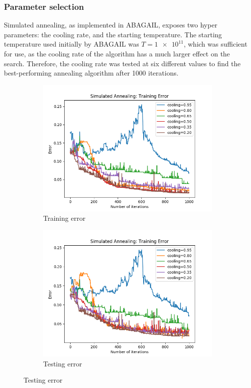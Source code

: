 \documentclass{article}
\begin{document}
      \subsubsection{Parameter selection}
        Simulated annealing, as implemented in ABAGAIL, exposes two hyper parameters: the cooling rate, and the starting temperature. The starting temperature used initially by ABAGAIL was $T = \num{1e11}$, which was sufficient for use, as the cooling rate of the algorithm has a much larger effect on the search. Therefore, the cooling rate was tested at six different values to find the best-performing annealing algorithm after 1000 iterations.

        \begin{figure}[htb]
        \centering

        \begin{subfigure}{0.5\textwidth}
          \includegraphics[width=\linewidth]{out/sa/cooling-error-training.png}
          \caption{Training error}
          \label{fig:sa-params-1}
        \end{subfigure}\hfil
        \begin{subfigure}{0.5\textwidth}
          \includegraphics[width=\linewidth]{out/sa/cooling-error-testing.png}
          \caption{Testing error}
          \label{fig:sa-params-2}
        \end{subfigure}


\end{figure}
\end{document}
